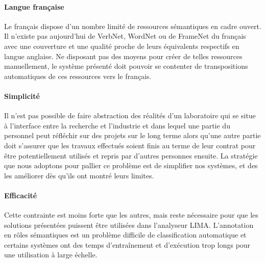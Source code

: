 \paragraph{Langue française} Le français dispose d'un nombre limité de
ressources sémantiques en cadre ouvert. Il n'existe pas aujourd'hui de VerbNet,
WordNet ou de FrameNet du français avec une couverture et une qualité proche de
leurs équivalents respectifs en langue anglaise. Ne disposant pas des moyens
pour créer de telles ressources manuellement, le système présenté doit pouvoir
se contenter de transpositions automatiques de ces ressources vers le français.

\paragraph{Simplicité} Il n'est pas possible de faire abstraction des réalités
d'un laboratoire qui se situe à l'interface entre la recherche et l'industrie
et dans lequel une partie du personnel peut réfléchir sur des projets sur le
long terme alors qu'une autre partie doit s'assurer que les travaux effectués
soient finis au terme de leur contrat pour être potentiellement utilisés et
repris par d'autres personnes ensuite. La stratégie que nous adoptons pour
pallier ce problème est de simplifier nos systèmes, et des les améliorer dès
qu'ils ont montré leurs limites.

\paragraph{Efficacité} Cette contrainte est moins forte que les autres, mais
reste nécessaire pour que les solutions présentées puissent être utilisées dans
l'analyseur LIMA. L'annotation en rôles sémantiques est un problème difficile
de classification automatique et certains systèmes ont des temps d'entraînement
et d'exécution trop longs pour une utilisation à large échelle.
